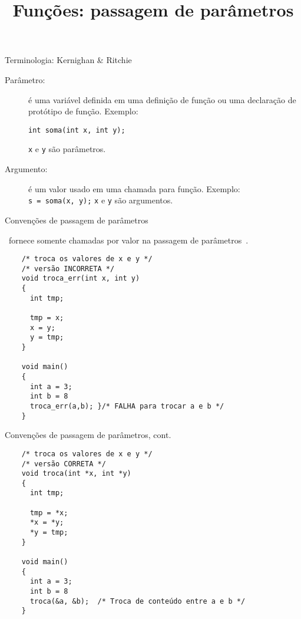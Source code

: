 \title{Funções: passagem de parâmetros}
\frame{\maketitle}

\begin{frame}{Terminologia: Kernighan \& Ritchie}

\small

\begin{description}
\item[Parâmetro:] é uma variável definida em uma definição de função
ou uma declaração de protótipo de função. Exemplo:

{\tt  int soma(int x, int y);}

\bigskip

{\tt x} e {\tt y} são parâmetros.

\pause
\item[Argumento:] é um valor usado em uma chamada para
função. Exemplo: \\

{\tt  s = soma(x, y);}
\bigskip
{\tt x} e {\tt y} são argumentos.
\end{description}

\end{frame}

\begin{frame}[fragile]{Convenções de passagem de parâmetros}

 \CEE\ fornece somente \alert{chamadas por valor} na passagem de
 parâmetros~\cite{cref2002}.

  \begin{lstlisting}
    /* troca os valores de x e y */
    /* versão INCORRETA */
    void troca_err(int x, int y) 
    {
      int tmp;
      
      tmp = x; 
      x = y; 
      y = tmp;
    }
    
    void main()
    {
      int a = 3;
      int b = 8
      troca_err(a,b); }/* FALHA para trocar a e b */
    }
\end{lstlisting}
\end{frame}

\begin{frame}[fragile]{Convenções de passagem de parâmetros, cont.}
  \begin{lstlisting}
    /* troca os valores de x e y */
    /* versão CORRETA */
    void troca(int *x, int *y) 
    {
      int tmp;
      
      tmp = *x; 
      *x = *y; 
      *y = tmp;
    }
    
    void main()
    {
      int a = 3;
      int b = 8
      troca(&a, &b);  /* Troca de conteúdo entre a e b */
    }
\end{lstlisting}
\end{frame}


